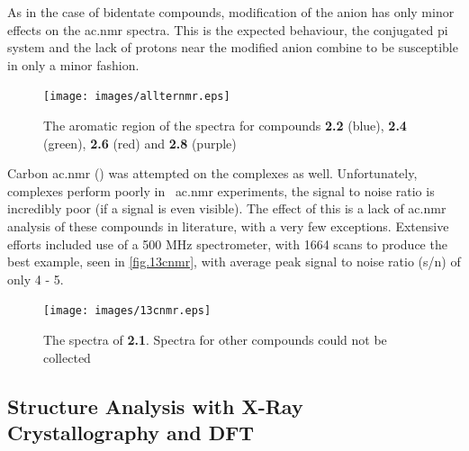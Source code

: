 As in the case of bidentate compounds, modification of the anion has only minor effects on the \gls{ac.nmr} spectra. This is the expected behaviour, the conjugated pi system and the lack of protons near the modified anion combine to be susceptible in only a minor fashion.  

\begin{figure}[!htb]
 \begin{center}
  \texttt{[image: images/allternmr.eps]}
 \end{center}
\caption[The aromatic region of the \texorpdfstring{}{1H}  spectra of the four terdentate compounds]{The aromatic region of the \texorpdfstring{}{1H}  spectra for compounds \textbf{2.2} (blue), \textbf{2.4} (green), \textbf{2.6} (red) and \textbf{2.8} (purple)}
\label{fig.ter4nmr}
\end{figure} 

Carbon \gls{ac.nmr} () was attempted on the complexes as well. Unfortunately,  complexes perform poorly in ~\gls{ac.nmr} experiments, the signal to noise ratio is incredibly poor (if a signal is even visible). The effect of this is a lack of  \gls{ac.nmr} analysis of these compounds in literature, with a very few exceptions. Extensive efforts included use of a 500 MHz spectrometer, with 1664 scans to produce the best example, seen in \autoref{fig.13cnmr}, with average peak signal to noise ratio (s/n) of only 4 - 5.

\begin{figure}[!htb]
 \begin{center}
  \texttt{[image: images/13cnmr.eps]}
 \end{center}
\caption[The 13C  spectra of \textbf{2.1}]{The   spectra of \textbf{2.1}. Spectra for other compounds could not be collected}
\label{fig.13cnmr}
\end{figure} 

\FloatBarrier

\subsection{Structure Analysis with X-Ray Crystallography and DFT}\label{ss.xray}

